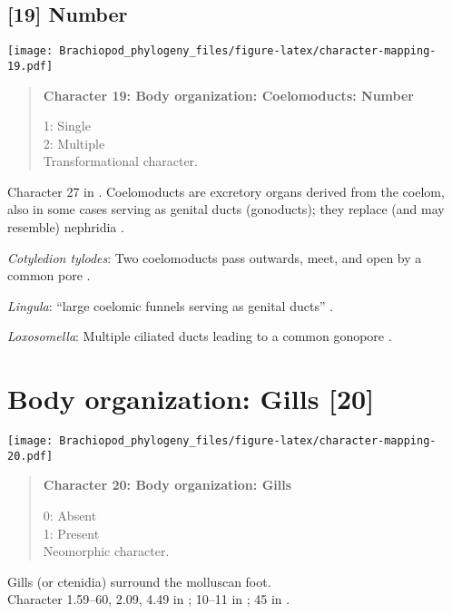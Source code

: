 \documentclass[openany]{book}
\theoremstyle{definition}
\theoremstyle{definition}
\theoremstyle{definition}
\theoremstyle{remark}
\begin{document}
\subsection*{{[}19{]} Number}\label{number-1}

\texttt{[image: Brachiopod\_phylogeny\_files/figure-latex/character-mapping-19.pdf]}

\begin{quote}
\textbf{Character 19: Body organization: Coelomoducts: Number}

1: Single\\
2: Multiple\\
Transformational character.
\end{quote}

Character 27 in \citet{Haszprunar2000}. Coelomoducts are excretory
organs derived from the coelom, also in some cases serving as genital
ducts (gonoducts); they replace (and may resemble) nephridia
\citep{Goodrich1945}.

\hypertarget{Cotyledion_tylodes-coding-19}{}
\emph{Cotyledion tylodes}: Two coelomoducts pass outwards, meet, and
open by a common pore \citep{Goodrich1945}.

\hypertarget{Lingula-coding-19}{}
\emph{Lingula}: ``large coelomic funnels serving as genital ducts''
\citep{Goodrich1945}.

\hypertarget{Loxosomella-coding-19}{}
\emph{Loxosomella}: Multiple ciliated ducts leading to a common gonopore
\citep{Goodrich1945}.

\section{Body organization: Gills
{[}20{]}}\label{body-organization-gills-20}

\texttt{[image: Brachiopod\_phylogeny\_files/figure-latex/character-mapping-20.pdf]}

\begin{quote}
\textbf{Character 20: Body organization: Gills}

0: Absent\\
1: Present\\
Neomorphic character.
\end{quote}

Gills (or ctenidia) surround the molluscan foot.\\
Character 1.59--60, 2.09, 4.49 in \citet{SPS1996}; 10--11 in
\citet{Haszprunar2000}; 45 in \citet{Sutton2012}.
\end{document}
